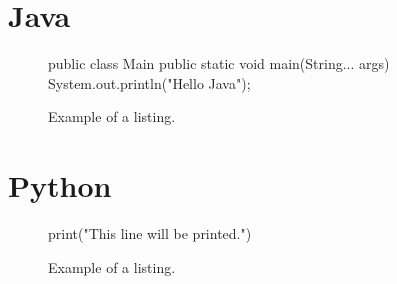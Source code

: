 
\lipsum[1]

\section{Java}

\lipsum[1]

\begin{figure}
\begin{pygmented}[lang=c]
public class Main {
    public static void main(String... args) {
        System.out.println("Hello Java");
    }
}
\end{pygmented}
\caption{Example of a listing.}
\label{lst:java}
\end{figure}

\section{Python}

\lipsum[1]

\begin{figure}
\begin{pygmented}[lang=c]
print("This line will be printed.")
\end{pygmented}
\caption{Example of a listing.}
\label{lst:python}
\end{figure}

\lipsum[1]
